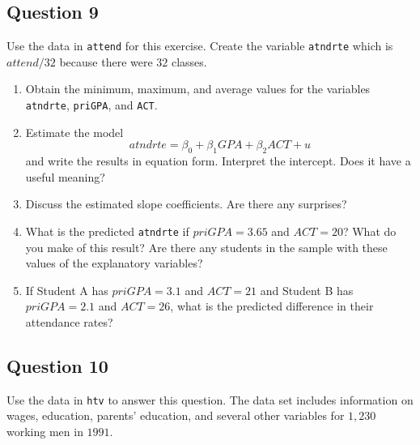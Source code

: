 \documentclass[]{article}
\providecommand{\tightlist}{%
  \setlength{\itemsep}{0pt}\setlength{\parskip}{0pt}}
\begin{document}
\subsection{Question 9}\label{question-9}

Use the data in \texttt{attend} for this exercise. Create the variable
\texttt{atndrte} which is \(attend/32\) because there were \(32\)
classes.

\begin{enumerate}
\def\labelenumi{\arabic{enumi}.}
\tightlist
\item
  Obtain the minimum, maximum, and average values for the variables
  \texttt{atndrte}, \texttt{priGPA}, and \texttt{ACT}.
\item
  Estimate the model \[atndrte=\beta_0+\beta_1 GPA + \beta_2 ACT + u\]
  and write the results in equation form. Interpret the intercept. Does
  it have a useful meaning?
\item
  Discuss the estimated slope coefficients. Are there any surprises?
\item
  What is the predicted \texttt{atndrte} if \(priGPA=3.65\) and
  \(ACT=20\)? What do you make of this result? Are there any students in
  the sample with these values of the explanatory variables?
\item
  If Student A has \(priGPA=3.1\) and \(ACT=21\) and Student B has
  \(priGPA=2.1\) and \(ACT=26\), what is the predicted difference in
  their attendance rates?
\end{enumerate}

\subsection{Question 10}\label{question-10}

Use the data in \texttt{htv} to answer this question. The data set
includes information on wages, education, parents' education, and
several other variables for \(1,230\) working men in \(1991\).
\end{document}

